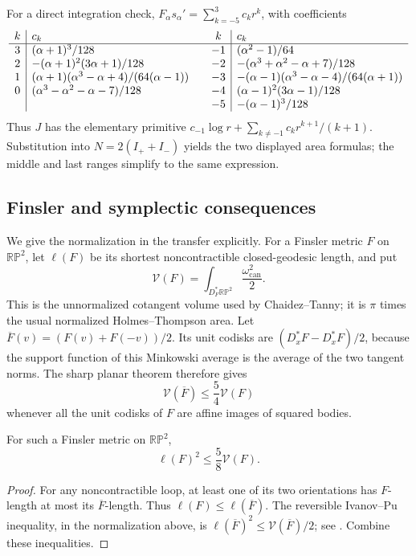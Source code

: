 For a direct integration check, $F_\alpha s_\alpha'=\sum_{k=-5}^3c_k r^k$, with coefficients
\[
\begin{array}{c|l@{\qquad}c|l}
k&c_k&k&c_k\\\hline
3&(\alpha+1)^3/128&-1&(\alpha^2-1)/64\\
2&-(\alpha+1)^2(3\alpha+1)/128&-2&-(\alpha^3+\alpha^2-\alpha+7)/128\\
1&(\alpha+1)(\alpha^3-\alpha+4)/(64(\alpha-1))&-3&-(\alpha-1)(\alpha^3-\alpha-4)/(64(\alpha+1))\\
0&(\alpha^3-\alpha^2-\alpha-7)/128&-4&(\alpha-1)^2(3\alpha-1)/128\\
&&-5&-(\alpha-1)^3/128
\end{array}
\]
Thus $J$ has the elementary primitive $c_{-1}\log r+\sum_{k\ne-1}c_k r^{k+1}/(k+1)$. Substitution into $N=2(I_++I_-)$ yields the two displayed area formulas; the middle and last ranges simplify to the same expression.


\subsection{Finsler and symplectic consequences}

We give the normalization in the transfer explicitly. For a Finsler metric
$F$ on $\mathbb{RP}^2$, let $\ell(F)$ be its shortest noncontractible
closed-geodesic length, and put
\[
 \mathcal V(F)=\int_{D_F^*\mathbb{RP}^2}\frac{\omega_{\mathrm{can}}^2}{2}.
\]
This is the unnormalized cotangent volume used by Chaidez--Tanny; it is
$\pi$ times the usual normalized Holmes--Thompson area. Let
$\overline F(v)=(F(v)+F(-v))/2$. Its unit codisks are
$(D_x^*F-D_x^*F)/2$, because the support function of this Minkowski average
is the average of the two tangent norms. The sharp planar theorem therefore gives
\[
 \mathcal V(\overline F)\leq\frac54\mathcal V(F)
\]
whenever all the unit codisks of $F$ are affine images of squared bodies.

\begin{corollary}\label{cor:squared-finsler}
For such a Finsler metric on $\mathbb{RP}^2$,
\[
 \ell(F)^2\leq\frac58\mathcal V(F).
\]
\end{corollary}
\begin{proof}
For any noncontractible loop, at least one of its two orientations has
$F$-length at most its $\overline F$-length. Thus
$\ell(F)\leq\ell(\overline F)$. The reversible Ivanov--Pu inequality,
in the normalization above, is
$\ell(\overline F)^2\leq\mathcal V(\overline F)/2$;
see \cite[Theorem~3.7 and Lemma~3.8]{CT2026}. Combine these inequalities.
\end{proof}

